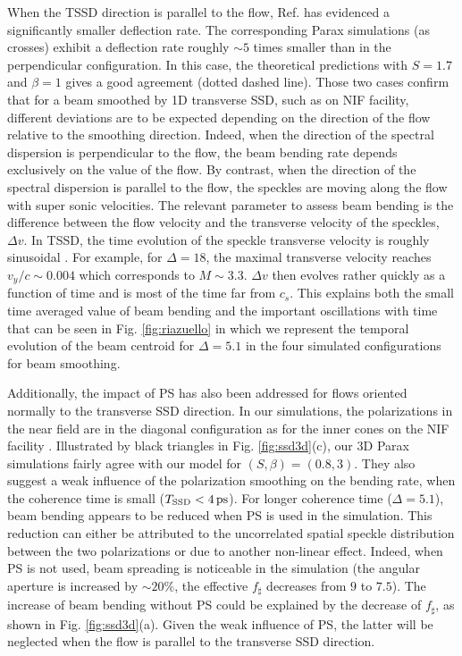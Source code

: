 \documentclass[%
 reprint,
 amsmath,amssymb,
 aps,
]{revtex4-1}
\begin{document}
When the TSSD direction is parallel to the flow, Ref. \cite[]{POP_Rose_Ghosal_98} has evidenced a significantly smaller deflection rate. The corresponding Parax simulations (as crosses) exhibit a deflection rate roughly $\sim 5$ times smaller than in the perpendicular configuration. In this case, the theoretical predictions with $S=1.7$ and $\beta=1$ gives a good agreement (dotted dashed line). Those two cases confirm that for a beam smoothed by 1D transverse SSD, such as on NIF facility, different deviations are to be expected depending on the direction of the flow relative to the smoothing direction.
Indeed, when the direction of the spectral dispersion is perpendicular to the flow, the beam bending rate depends exclusively on the value of the flow. By contrast, when the direction of the spectral dispersion is parallel to the flow, the speckles are moving along the flow with super sonic velocities. The relevant parameter to assess beam bending is the difference between the flow velocity and the transverse velocity of the speckles, $\Delta v$. In TSSD, the time evolution of the speckle transverse velocity is roughly sinusoidal \cite[]{Videau_1999}. For example, for $\Delta=18$, the maximal transverse velocity reaches $v_y/c \sim 0.004$ which corresponds to $M\sim 3.3$. $\Delta v$ then evolves rather quickly as a function of time and is most of the time far from $c_s$. This explains both the small time averaged value of beam bending and the important oscillations with time that can be seen in Fig. \ref{fig:riazuello} in which we represent the temporal evolution of the beam centroid for $\Delta = 5.1$ in the four simulated configurations for beam smoothing.

%
Additionally, the impact of PS has also been addressed for flows oriented normally to the transverse SSD direction. In our simulations, the polarizations in the near field are in the diagonal configuration as for the inner cones on the NIF facility \cite[]{NIF_user_guide}. 
Illustrated by  black triangles in Fig. \ref{fig:ssd3d}(c), our 3D Parax simulations fairly agree with our model  for  $(S,\beta)=(0.8,3)$.
They also suggest a weak  influence of the polarization smoothing on the bending rate, 
when the coherence time is small  ($T_\mathrm{SSD}< 4\,\rm ps$). For longer coherence time ($\Delta = 5.1$), beam bending appears to be reduced when PS is used in the simulation. This reduction can either be attributed to the uncorrelated spatial speckle distribution between the two polarizations or due to another non-linear effect. Indeed, when PS is not used, beam spreading is noticeable in the simulation (the angular aperture is increased by $\sim 20\%$, the effective $f_\sharp$ decreases from $9$ to $7.5$). The increase of beam bending without PS could be explained by the decrease of $f_\sharp$, as shown in Fig. \ref{fig:ssd3d}(a).
Given the weak influence of PS, the latter will be neglected when the flow is parallel to the transverse SSD direction.  
%
\end{document}
